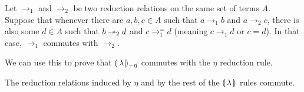 \begin{lemma}\label{lem:commutativity}
  Let $\to_1$ and $\to_2$ be two reduction relations on the same set of
  terms $A$. Suppose that whenever there are $a,b,c \in A$ such that
  $a \to_1 b$ and $a \to_2 c$, there is also some $d \in A$ such that
  $b \twoheadrightarrow_2 d$ and $c \to_1^= d$ (meaning $c \to_1 d$ or $c = d$). In that
  case, $\to_1$ commutes with $\to_2$.
\end{lemma}

We can use this to prove that $\llparenthesis \, \lambda \, \rrparenthesis_{-\eta}$ commutes with the
$\eta$ reduction rule.

\begin{lemma}\label{lem:eta-commutes}

  The reduction relations induced by $\eta$ and by the rest of the
  $\llparenthesis \, \lambda \, \rrparenthesis$ rules commute.
\end{lemma}

